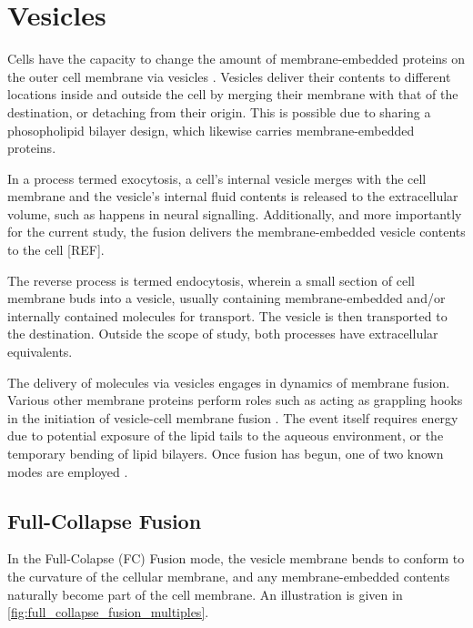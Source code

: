 \documentclass{report}
\begin{document}
\section{Vesicles}
Cells have the capacity to change the amount of membrane-embedded proteins on the outer cell membrane via vesicles \cite{ales2007gene}. Vesicles deliver their contents to different locations inside and outside the cell by merging their membrane with that of the destination, or detaching from their origin. This is possible due to sharing a phosopholipid bilayer design, which likewise carries membrane-embedded proteins.

In a process termed exocytosis, a cell's internal vesicle merges with the cell membrane and the vesicle's internal fluid contents is released to the extracellular volume, such as happens in neural signalling. Additionally, and more importantly for the current study, the fusion delivers the membrane-embedded vesicle contents to the cell [REF].

The reverse process is termed endocytosis, wherein a small section of cell membrane buds into a vesicle, usually containing membrane-embedded and/or internally contained molecules for transport. The vesicle is then transported to the destination. Outside the scope of study, both processes have extracellular equivalents.

The delivery of molecules via vesicles engages in dynamics of membrane fusion. Various other membrane proteins perform roles such as acting as grappling hooks in the initiation of vesicle-cell membrane fusion \cite{han2017multifaceted}. The event itself requires energy due to potential exposure of the lipid tails to the aqueous environment, or the temporary bending of lipid bilayers. Once fusion has begun, one of two known modes are employed \cite{harata2006kiss}.

\subsection{Full-Collapse Fusion}
In the Full-Colapse (FC) Fusion mode, the vesicle membrane bends to conform to the curvature of the cellular membrane, and any membrane-embedded contents naturally become part of the cell membrane. An illustration is given in \autoref{fig:full_collapse_fusion_multiples}.
\end{document}
